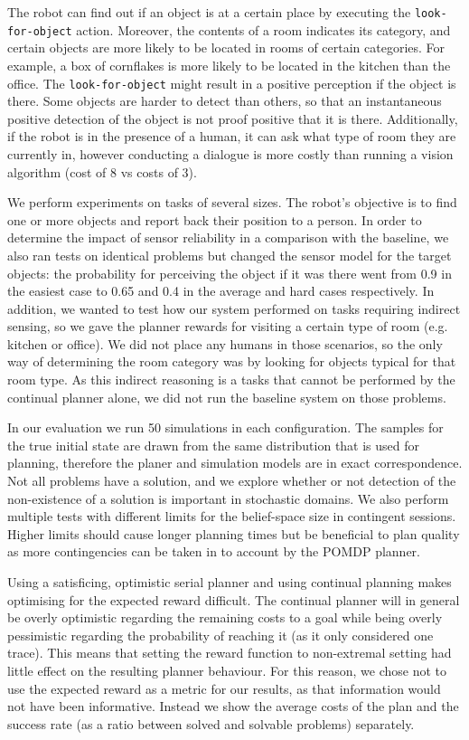 The robot can find out if an object is at a certain place by executing
the {\tt look-for-object} action. Moreover, the contents of a room
indicates its category, and certain objects are more likely to be
located in rooms of certain categories. For example, a box of
cornflakes is more likely to be located in the kitchen than the
office. The {\tt look-for-object} might result in a positive
perception if the object is there. Some objects are harder to detect
than others, so that an instantaneous positive detection of the object
is not proof positive that it is there. Additionally, if the robot is
in the presence of a human, it can ask what type of room they are
currently in, however conducting a dialogue is more costly than
running a vision algorithm (cost of 8 vs costs of 3).

We perform experiments on tasks of several sizes. The robot's
objective is to find one or more objects and report back their
position to a person. In order to determine the impact of sensor
reliability in a comparison with the baseline, we also ran tests on
identical problems but changed the sensor model for the target
objects: the probability for perceiving the object if it was there
went from 0.9 in the easiest case to 0.65 and 0.4 in the average and
hard cases respectively. In addition, we wanted to test how our system
performed on tasks requiring indirect sensing, so we gave the planner
rewards for visiting a certain type of room (e.g. kitchen or
office). We did not place any humans in those scenarios, so the only
way of determining the room category was by looking for objects
typical for that room type. As this indirect reasoning is a tasks that
cannot be performed by the continual planner alone, we did not run the
baseline system on those problems.



In our evaluation we run 50 simulations in each configuration. The
samples for the true initial state are drawn from the same
distribution that is used for planning, therefore the planer and
simulation models are in exact correspondence. Not all problems have a
solution, and we explore whether or not detection of the non-existence
of a solution is important in stochastic domains.
We also perform multiple tests
with different limits for the belief-space size in contingent
sessions.  Higher limits should cause longer planning times but be
beneficial to plan quality as more contingencies can be taken in to
account by the POMDP planner.


Using a satisficing, optimistic serial planner and using continual
planning makes optimising for the expected reward difficult. The
continual planner will in general be overly optimistic regarding the
remaining costs to a goal while being overly pessimistic regarding the
probability of reaching it (as it only considered one trace). This
means that setting the reward function to non-extremal setting had
little effect on the resulting planner behaviour. For this reason, we
chose not to use the expected reward as a metric for our results, as
that information would not have been informative. Instead we show the
average costs of the plan and the success rate (as a ratio between
solved and solvable problems) separately.

